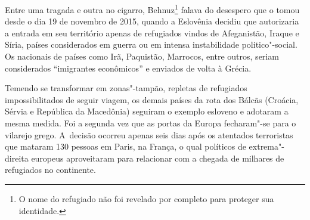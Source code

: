  

Entre uma tragada e outra no cigarro, Behnuz\footnote{ O nome do refugiado não foi revelado por completo
para proteger sua identidade.}  falava do
desespero que o tomou desde o dia 19 de novembro de 2015, quando a
Eslovênia decidiu que autorizaria a entrada em seu território apenas de
refugiados vindos de Afeganistão, Iraque e Síria, países considerados em
guerra ou em intensa instabilidade politico"-social. Os nacionais de
países como Irã, Paquistão, Marrocos, entre outros, seriam considerados
``imigrantes econômicos'' e enviados de volta à Grécia.

Temendo se transformar em zonas"-tampão, repletas de refugiados
impossibilitados de seguir viagem, os demais países da rota dos Bálcãs
(Croácia, Sérvia e República da Macedônia) seguiram o exemplo esloveno e
adotaram a mesma medida. Foi a segunda vez que as portas da Europa
fecharam"-se para o vilarejo grego. A~decisão ocorreu apenas seis dias
após os atentados terroristas que mataram 130 pessoas em Paris, na
França, o qual políticos de extrema"-direita europeus aproveitaram para
relacionar com a chegada de milhares de refugiados no continente.

